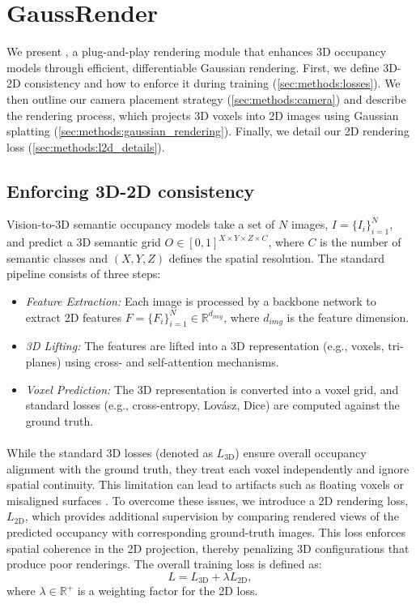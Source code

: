 \section{GaussRender}
\label{sec:methods}


We present \method{}, a plug-and-play rendering module that enhances 3D occupancy models through efficient, differentiable Gaussian rendering. First, we define 3D-2D consistency and how to enforce it during training (\autoref{sec:methods:losses}).
We then outline our camera placement strategy (\autoref{sec:methods:camera}) and describe the rendering process, which projects 3D voxels into 2D images using Gaussian splatting (\autoref{sec:methods:gaussian_rendering}).
Finally, we detail %
{our} 2D rendering loss (\autoref{sec:methods:l2d_details}).

\subsection{Enforcing 3D-2D consistency}
\label{sec:methods:losses}
Vision-to-3D semantic occupancy models \citep{wei2023surroundocc,huang2023tpv,jiang2024symphonies} take a set of $N$ images, $I = \{I_i\}_{i=1}^N$, and predict a 3D semantic grid $O \in [0,1]^{X \times Y \times Z \times C}$, where $C$ is the number of semantic classes and $(X, Y, Z)$ defines the spatial resolution.
The standard pipeline consists of three steps:
\begin{itemize}
    \item \textit{Feature Extraction:} Each image is processed by a backbone network to extract 2D features $F = \{F_i\}_{i=1}^N \in \mathbb{R}^{d_\textit{img}}$, where $d_\textit{img}$ is the feature dimension.
    \item \textit{3D Lifting:} The features are lifted into a 3D representation (e.g., voxels, tri-planes) using cross- and self-attention mechanisms.
    \item \textit{Voxel Prediction:} The 3D representation is converted into a voxel grid, and standard losses (e.g., cross-entropy, Lovász, Dice) are computed against the ground truth.
\end{itemize}

\paragraph{}
While the standard 3D losses (denoted as \(L_{\text{3D}}\)) ensure overall occupancy alignment {with the ground truth}, they treat each voxel independently and ignore spatial continuity. This limitation can lead to artifacts such as floating voxels or misaligned surfaces \citep{liu2024sparseocc}. To overcome these issues, we introduce a 2D rendering loss, \(L_{\text{2D}}\), which provides additional supervision by comparing rendered views of the predicted occupancy with corresponding ground-truth images. This loss enforces spatial coherence in the 2D projection, thereby penalizing 3D configurations that produce poor renderings. The overall training loss is defined as:
\begin{equation}
L = L_{\text{3D}} + \lambda L_{\text{2D}},
\end{equation}
where $\lambda \in \mathbb{R}^+$ is a weighting factor for the 2D loss.

